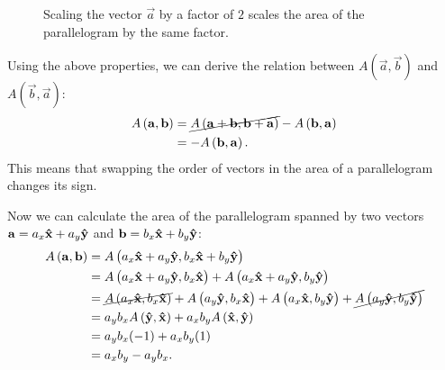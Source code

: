 \documentclass{article}
\begin{document}
\begin{figure}
	\begin{center}
	\end{center}
	\caption{Scaling the vector $\vec{a}$ by a factor of $2$ scales the area of the parallelogram by the same factor.}
	\label{fig:scaling_parallelogram}
\end{figure}

Using the above properties, we can derive the relation between $A\left(\vec{a},\vec{b}\right)$ and $A\left(\vec{b},\vec{a}\right)$:
\begin{equation}
	\begin{aligned}
		A\left(\vec{a},\vec{b}\right) & = \cancel{A\left(\vec{a}+\vec{b},\vec{b}+\vec{a}\right)} - A\left(\vec{b},\vec{a}\right) \\
		                              & = -A\left(\vec{b},\vec{a}\right).
	\end{aligned}
	\label{eq:sqapping_order_of_vectors_area_paeallelogram}
\end{equation}
This means that swapping the order of vectors in the area of a parallelogram changes its sign.

Now we can calculate the area of the parallelogram spanned by two vectors $\mathbf{a}=a_{x}\mathbf{\hat{x}}+a_{y}\mathbf{\hat{y}}$ and $\mathbf{b}=b_{x}\mathbf{\hat{x}}+b_{y}\mathbf{\hat{y}}$:
\begin{equation}
	\begin{aligned}
		A\left(\vec{a},\vec{b}\right) &= A\left(a_{x}\xhat+a_{y}\yhat, b_{x}\xhat+b_{y}\yhat\right)\\
									  &= A\left(a_{x}\xhat+a_{y}\yhat, b_{x}\xhat\right) + A\left(a_{x}\xhat+a_{y}\yhat, b_{y}\yhat\right)\\
									  &= \cancel{A\left(a_{x}\xhat, b_{x}\xhat\right)} + A\left(a_{y}\yhat, b_{x}\xhat\right) + A\left(a_{x}\xhat, b_{y}\yhat\right) + \cancel{A\left(a_{y}\yhat, b_{y}\yhat\right)}\\
									  &= a_{y}b_{x}A\left(\yhat,\xhat\right) + a_{x}b_{y}A\left(\xhat,\yhat\right)\\
									  &= a_{y}b_{x}(-1) + a_{x}b_{y}(1)\\
									  &= a_{x}b_{y} - a_{y}b_{x}.
	\end{aligned}
	\label{eq:label}
\end{equation}
\end{document}
